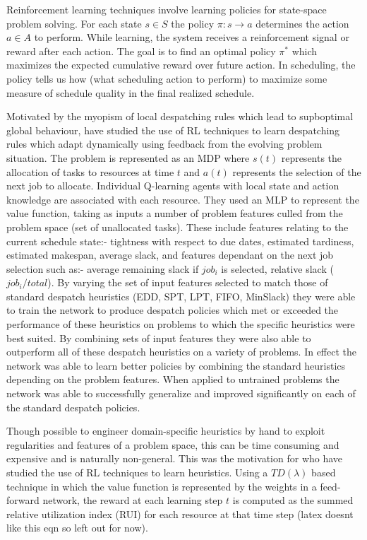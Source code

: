 Reinforcement learning techniques involve learning policies for state-space problem solving. For each state $s \in S$ the policy $\pi:s \rightarrow a$ determines the action $a \in A$ to perform. While learning, the system receives a reinforcement signal or reward after each action. The goal is to find an optimal policy $\pi^*$ which maximizes the expected cumulative reward over future action. In scheduling, the policy tells us how (what scheduling action to perform) to maximize some measure of schedule quality in the final realized schedule.

Motivated by the myopism of local despatching rules which lead to supboptimal global behaviour, \cite{riedmiller99neural} have studied the use of RL techniques to learn despatching rules which adapt dynamically using feedback from the evolving problem situation. The problem is represented as an MDP where $s(t)$ represents the allocation of tasks to resources at time $t$ and $a(t)$ represents the selection of the next job to allocate. Individual Q-learning agents with local state and action knowledge are associated with each resource. They used an MLP to represent the value function, taking as inputs a number of problem features culled from the problem space (set of unallocated tasks). These include features relating to the current schedule state:- tightness with respect to due dates, estimated tardiness, estimated makespan, average slack, and features dependant on the next job selection such as:- average remaining slack if $job_i$ is selected, relative slack ($job_i/total$). By varying the set of input features selected to match those of standard despatch heuristics (EDD, SPT, LPT, FIFO, MinSlack) they were able to train the network to produce despatch policies which met or exceeded the performance of these heuristics on problems to which the specific heuristics were best suited. By combining sets of input features they were also able to outperform all of these despatch heuristics on a variety of problems. In effect the network was able to learn better policies by combining the standard heuristics depending on the problem features. When applied to untrained problems the network was able to successfully generalize and improved significantly on each of the standard despatch policies.

Though possible to engineer domain-specific heuristics by hand to exploit regularities and features of a problem space, this can be time consuming and expensive and is naturally non-general. This was the motivation for \cite{zhang95reinforcement} who have studied the use of RL techniques to learn heuristics. Using a $TD(\lambda)$ based technique in which the value function is represented by the weights in a feed-forward network, the reward at each learning step $t$ is computed as the summed relative utilization index (RUI) for each resource at that time step (latex doesnt like this eqn so left out for now).


